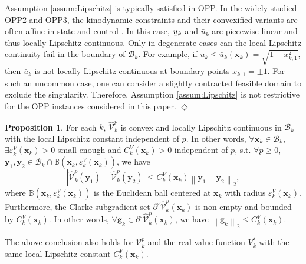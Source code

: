 \documentclass[journal]{IEEEtran}
\theoremstyle{definition}
\newtheorem{proposition}{Proposition}
\theoremstyle{definition}
\newtheorem*{remark}{Remark}
\let\oldremark\remark
\let\endoldremark\endremark
\renewenvironment{remark}
  {\oldremark}
  {\hfill$\Diamond$\endoldremark}
\newcommand\norm[2][1]{\left\|#2\right\|_{#1}}
\newcommand\abs[1]{\left|#1\right|}
\renewcommand\vector[1]{\boldsymbol{#1}}
\newcommand\vg{{\vector{g}}}
\newcommand\vx{{\vector{x}}}
\newcommand\vy{{\vector{y}}}
\DeclareRobustCommand{\underbar}[1]{\kern0.3\fontdimen2\font\underaccent{\bar}{\kern-0.3\fontdimen2\font #1}}
\begin{document}
\begin{remark}
    Assumption \ref{assum:Lipschitz} is typically satisfied in OPP. In the widely studied OPP2 and OPP3, the kinodynamic constraints and their convexified variants are often affine in state and control \cite[Appendix A.2]{wang2026online}. In this case, $\underbar{u}_k$ and $\bar{u}_k$ are piecewise linear and thus locally Lipschitz continuous. Only in degenerate cases can the local Lipschitz continuity fail in the boundary of $\mathcal{B}_k$. For example, if $u_k\leq\bar{u}_k(\vx_k)=\sqrt{1-x_{k,1}^2}$, then $\bar{u}_k$ is not locally Lipschitz continuous at boundary points $x_{k,1}=\pm1$. For such an uncommon case, one can consider a slightly contracted feasible domain to exclude the singularity. Therefore, Assumption \ref{assum:Lipschitz} is not restrictive for the OPP instances considered in this paper.
\end{remark}

\begin{proposition}\label{prop:Lipschitz}
    For each $k$, $\widehat{\mathcal{V}}_k^p$ is convex and locally Lipschitz continuous in $\mathcal{B}_k$ with the local Lipschitz constant independent of $p$. In other words, $\forall\vx_k\in\mathcal{B}_k$, $\exists \varepsilon_k^V(\vx_k)>0$ small enough and $C_k^V(\vx_k)>0$ independent of $p$, s.t. $\forall p\geq0$, $\vy_1,\vy_2\in\mathcal{B}_k\cap\mathbb{B}(\vx_k,\varepsilon_k^V(\vx_k))$, we have
    \begin{equation}
        \abs{\widehat{\mathcal{V}}_k^p(\vy_1)-\widehat{\mathcal{V}}_k^p(\vy_2)}\leq C_k^V(\vx_k)\norm[2]{\vy_1-\vy_2},
    \end{equation}
    where $\mathbb{B}(\vx_k,\varepsilon_k^V(\vx_k))$ is the Euclidean ball centered at $\vx_k$ with radius $\varepsilon_k^V(\vx_k)$.  Furthermore, the Clarke subgradient set $\partial^\circ\widehat{\mathcal{V}}_k^p(\vx_k)$ is non-empty and bounded by $C_k^V(\vx_k)$. In other words, $\forall \vg_k\in\partial^\circ\widehat{\mathcal{V}}_k^p(\vx_k)$, we have $\norm[2]{\vg_k}\leq C_k^V(\vx_k)$.

    The above conclusion also holds for $\mathcal{V}_k^p$ and the real value function $V_k^*$ with the same local Lipschitz constant $C_k^V(\vx_k)$.
\end{proposition}
\end{document}
